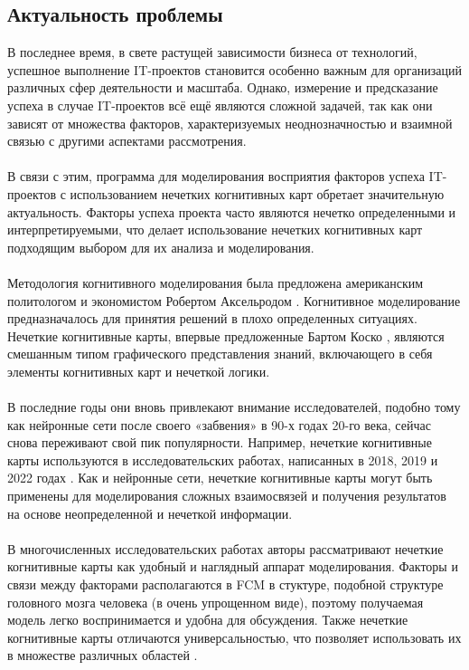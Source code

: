 \documentclass{article}
\begin{document}
    \subsection {Актуальность проблемы}
    В последнее время, в свете растущей зависимости бизнеса от технологий, успешное выполнение IT-проектов становится особенно важным для организаций различных сфер деятельности и масштаба. Однако, измерение и предсказание успеха в случае IT-проектов всё ещё являются сложной задачей, так как они зависят от множества факторов, характеризуемых неоднозначностью и взаимной связью с другими аспектами рассмотрения.\\
    ~\\
    В связи с этим, программа для моделирования восприятия факторов успеха IT-проектов с использованием нечетких когнитивных карт обретает значительную актуальность. Факторы успеха проекта часто являются нечетко определенными и интерпретируемыми, что делает использование нечетких когнитивных карт подходящим выбором для их анализа и моделирования.\\
    ~\\
    Методология когнитивного моделирования была предложена американским политологом и экономистом Робертом Аксельродом \cite{litlink12}. Когнитивное моделирование предназначалось для принятия решений в плохо определенных ситуациях. Нечеткие когнитивные карты, впервые предложенные Бартом Коско \cite{litlink13}, являются смешанным типом графического представления знаний, включающего в себя элементы когнитивных карт и нечеткой логики.\\
    ~\\
    В последние годы они вновь привлекают внимание исследователей, подобно тому как нейронные сети после своего «забвения» в 90-х годах 20-го века, сейчас снова переживают свой пик популярности. Например, нечеткие когнитивные карты используются в исследовательских работах, написанных в 2018, 2019 и 2022 годах \cite{litlink14, litlink15, litlink16}. Как и нейронные сети, нечеткие когнитивные карты могут быть применены для моделирования сложных взаимосвязей и получения результатов на основе неопределенной и нечеткой информации.\\
    ~\\
    В многочисленных исследовательских работах авторы рассматривают нечеткие когнитивные карты как удобный и наглядный аппарат моделирования. Факторы и связи между факторами располагаются в FCM в стуктуре, подобной структуре головного мозга человека (в очень упрощенном виде), поэтому получаемая модель легко воспринимается и удобна для обсуждения. Также нечеткие когнитивные карты отличаются универсальностью, что позволяет использовать их в множестве различных областей \cite{litlink17}.\\
\end{document}
